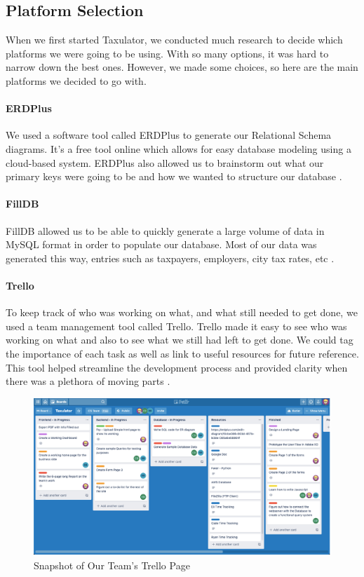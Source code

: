 \documentclass[sigconf]{acmart}
\begin{document}
\subsection{Platform Selection}
When we first started Taxulator, we conducted much research to decide which platforms we were going to be using. With so many options, it was hard to narrow down the best ones. However, we made some choices, so here are the main platforms we decided to go with.

\paragraph{ERDPlus}
We used a software tool called ERDPlus to generate our Relational Schema diagrams. It’s a free tool online which allows for easy database modeling using a cloud-based system. ERDPlus also allowed us to brainstorm out what our primary keys were going to be and how we wanted to structure our database \cite{ERDPlus}.

\paragraph{FillDB}
FillDB allowed us to be able to quickly generate a large volume of data in MySQL format in order to populate our database. Most of our data was generated this way, entries such as taxpayers, employers, city tax rates, etc \cite{FillDB}.

\paragraph{Trello}
To keep track of who was working on what, and what still needed to get done, we used a team management tool called Trello. Trello made it easy to see who was working on what and also to see what we still had left to get done. We could tag the importance of each task as well as link to useful resources for future reference. This tool helped streamline the development process and provided clarity when there was a plethora of moving parts \cite{Trello}.

\begin{figure}[H]
  \label{Trello}
  \centering
  \includegraphics[width=\linewidth]{Images/TrelloBoard.png}
  \caption{Snapshot of Our Team’s Trello Page}
\end{figure}
\end{document}
